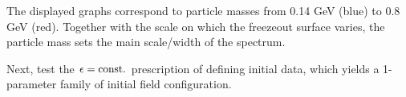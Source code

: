 {\begin{minipage}{\linewidth}
{\begin{minipage}{0.45\linewidth}
            \end{minipage}
        }
    \end{minipage}
}
The displayed graphs correspond to particle masses from 0.14 GeV (blue) to 0.8 GeV (red). Together with the scale on which the freezeout surface varies, the particle mass sets the main scale/width of the spectrum.


Next, test the $\epsilon={\text{const.}}$ prescription of defining initial data, which yields a 1-parameter family of initial field configuration.\\
